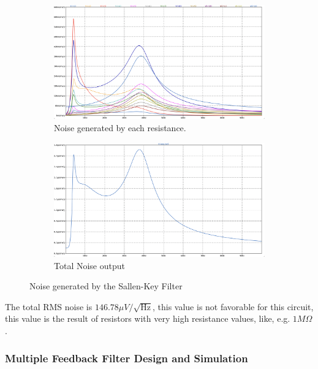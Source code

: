 \begin{figure}[H]
    \centering
    \begin{subfigure}{0.45\textwidth}
        \includegraphics*[width=\textwidth]{Images/NoiseResSK.png}
        \caption{Noise generated by each resistance.}
        \label{fig:NoiseResSk}  
    \end{subfigure}
    \begin{subfigure}{0.45\textwidth}
        \includegraphics*[width=\textwidth]{Images/NoiseTotalSK.png}
        \caption{Total Noise output}
        \label{fig:NoiseTotalSK}    
    \end{subfigure}
    \caption{Noise generated by the Sallen-Key Filter}
    \label{fig:NoiseSK}
\end{figure}

The total RMS noise is $146.78 \mu V / \sqrt{\si{\hertz}}$, this value is not favorable for this circuit, this value is the result of resistors with very high resistance values, like, e.g. $1M\Omega$.

\subsubsection{Multiple Feedback Filter Design and Simulation}

